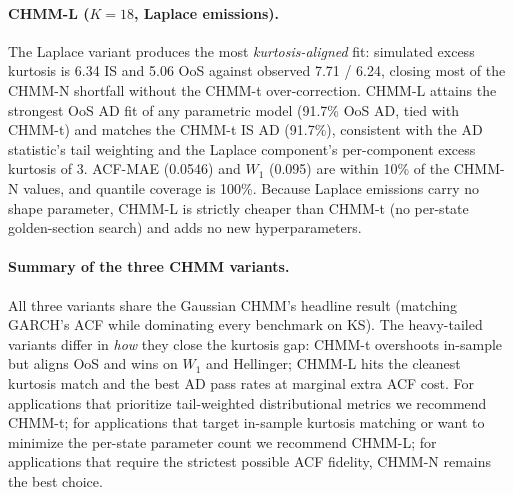 \paragraph{CHMM-L ($K = 18$, Laplace emissions).}
The Laplace variant produces the most \emph{kurtosis-aligned} fit: simulated excess kurtosis is 6.34 IS and 5.06 OoS against observed 7.71 / 6.24, closing most of the CHMM-N shortfall without the CHMM-t over-correction.
CHMM-L attains the strongest OoS AD fit of any parametric model (91.7\% OoS AD, tied with CHMM-t) and matches the CHMM-t IS AD (91.7\%), consistent with the AD statistic's tail weighting and the Laplace component's per-component excess kurtosis of 3.
ACF-MAE (0.0546) and $W_1$ (0.095) are within 10\% of the CHMM-N values, and quantile coverage is 100\%.
Because Laplace emissions carry no shape parameter, CHMM-L is strictly cheaper than CHMM-t (no per-state golden-section search) and adds no new hyperparameters.

\paragraph{Summary of the three CHMM variants.}
All three variants share the Gaussian CHMM's headline result (matching GARCH's ACF while dominating every benchmark on KS).
The heavy-tailed variants differ in \emph{how} they close the kurtosis gap: CHMM-t overshoots in-sample but aligns OoS and wins on $W_1$ and Hellinger; CHMM-L hits the cleanest kurtosis match and the best AD pass rates at marginal extra ACF cost.
For applications that prioritize tail-weighted distributional metrics we recommend CHMM-t; for applications that target in-sample kurtosis matching or want to minimize the per-state parameter count we recommend CHMM-L; for applications that require the strictest possible ACF fidelity, CHMM-N remains the best choice.

